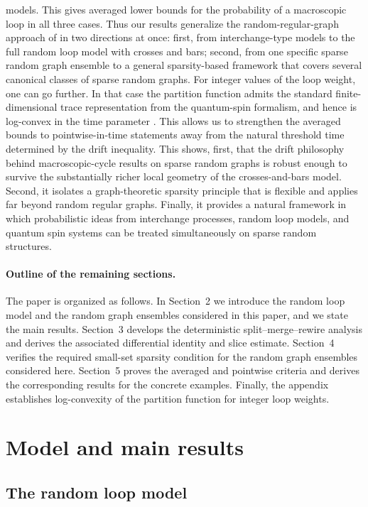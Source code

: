 \documentclass[11pt]{article}
\theoremstyle{remark}
\theoremstyle{plain}
\newcommand{\1}{\mathbbm{1}}
\begin{document}
models. This gives averaged lower bounds for the probability of a macroscopic loop in all three
cases. Thus our results generalize the random-regular-graph approach of
\cite{PoudevigneAuboiron2022} in two directions at once: first, from interchange-type models to
the full random loop model with crosses and bars; second, from one specific sparse random graph
ensemble to a general sparsity-based framework that covers several canonical classes of sparse
random graphs.
For integer values of the loop weight, one can go further. In that case the partition function
admits the standard finite-dimensional trace representation from the quantum-spin formalism, and
hence is log-convex in the time parameter \cite{Ueltschi2013}. This allows us to strengthen the
averaged bounds to pointwise-in-time statements away from the natural threshold time determined
by the drift inequality.
This shows, first, that the drift philosophy behind macroscopic-cycle results on sparse random
graphs is robust enough to survive the substantially richer local geometry of the
crosses-and-bars model. Second, it isolates a graph-theoretic sparsity principle that is
flexible and applies far beyond random regular graphs. Finally, it provides a natural framework
in which probabilistic ideas from interchange processes, random loop models, and quantum spin
systems can be treated simultaneously on sparse random structures.

\paragraph{Outline of the remaining sections.}
The paper is organized as follows. In Section~2 we introduce the random loop model and the random graph ensembles considered in this paper, and we state the main results. Section~3 develops the deterministic split--merge--rewire analysis and derives the associated differential identity and slice estimate. Section~4 verifies the required small-set sparsity condition for the random graph ensembles considered here. Section~5 proves the averaged and pointwise criteria and derives the corresponding results for the concrete examples. Finally, the appendix establishes log-convexity of the partition function for integer loop weights.


\section{Model and main results}
\subsection{The random loop model}
\end{document}
